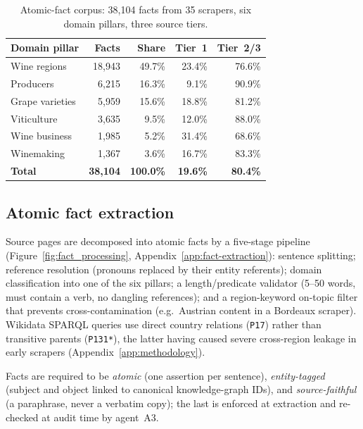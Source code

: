 \begin{table}[h]
  \centering
  \caption{Atomic-fact corpus: 38{,}104 facts from 35 scrapers, six
    domain pillars, three source tiers.}
  \label{tab:facts}
  \small
  \begin{tabular}{lrrrr}
    \toprule
    Domain pillar & Facts & Share & Tier~1 & Tier~2/3 \\
    \midrule
    Wine regions     & 18{,}943 & 49.7\% & 23.4\% & 76.6\% \\
    Producers        &  6{,}215 & 16.3\% &  9.1\% & 90.9\% \\
    Grape varieties  &  5{,}959 & 15.6\% & 18.8\% & 81.2\% \\
    Viticulture      &  3{,}635 &  9.5\% & 12.0\% & 88.0\% \\
    Wine business    &  1{,}985 &  5.2\% & 31.4\% & 68.6\% \\
    Winemaking       &  1{,}367 &  3.6\% & 16.7\% & 83.3\% \\
    \midrule
    \textbf{Total}   & \textbf{38{,}104} & \textbf{100.0\%} &
                       \textbf{19.6\%} & \textbf{80.4\%} \\
    \bottomrule
  \end{tabular}
\end{table}

\subsection{Atomic fact extraction}
\label{sec:extraction}
Source pages are decomposed into atomic facts by a five-stage pipeline
(Figure~\ref{fig:fact_processing}, Appendix~\ref{app:fact-extraction}):
sentence splitting; reference resolution (pronouns replaced by their
entity referents); domain classification into one of the six pillars;
a length/predicate validator (5--50 words, must contain a verb, no
dangling references); and a region-keyword on-topic filter that
prevents cross-contamination (e.g.\ Austrian content in a Bordeaux
scraper). Wikidata SPARQL queries use direct country relations
(\texttt{P17}) rather than transitive parents (\texttt{P131*}), the
latter having caused severe cross-region leakage in early scrapers
(Appendix~\ref{app:methodology}).

Facts are required to be \emph{atomic} (one assertion per sentence),
\emph{entity-tagged} (subject and object linked to canonical
knowledge-graph IDs), and \emph{source-faithful} (a paraphrase, never
a verbatim copy); the last is enforced at extraction and re-checked
at audit time by agent~A3.


